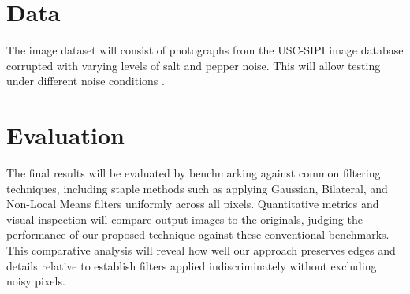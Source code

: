 \documentclass[10pt,twocolumn,letterpaper]{article}
\begin{document}
    \section{Data}
    The image dataset will consist of photographs from the USC-SIPI image
    database corrupted with varying levels of salt and pepper noise.
    This will allow testing under different noise conditions \cite{sipi_misc}.

    \section{Evaluation}
    The final results will be evaluated by benchmarking against common
    filtering techniques, including staple methods such as applying Gaussian,
    Bilateral, and Non-Local Means filters uniformly across all pixels.
    Quantitative metrics and visual inspection will compare output images to
    the originals, judging the performance of our proposed technique against
    these conventional benchmarks. This comparative analysis will reveal how
    well our approach preserves edges and details relative to establish filters
    applied indiscriminately without excluding noisy pixels.
    \newpage



    {\small
    
    
    }
\end{document}
